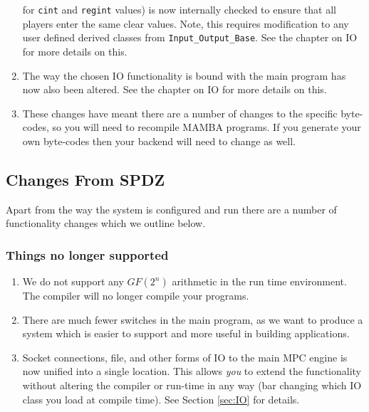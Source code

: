 \begin{enumerate}
for \verb+cint+ and \verb+regint+ values) is now internally checked to ensure that
all players enter the same clear values.
Note, this requires modification to any user defined
derived classes from \verb+Input_Output_Base+.
See the chapter on IO for more details on this.
\item The way the chosen IO functionality is bound with the main program
has now also been altered. See the chapter on IO for more details on this.
\item These changes have meant there are a number of changes to the
specific byte-codes, so you will need to recompile MAMBA programs.
If you generate your own byte-codes then your backend will need to
change as well.
\end{enumerate}


\subsection{Changes From SPDZ}
Apart from the way the system is configured and run there are
a number of functionality changes which we outline below.

\subsubsection{Things no longer supported}
\begin{enumerate}
\item We do not support any $GF(2^n)$ arithmetic in the run time
environment. The compiler will no longer compile your programs.
\item There are much fewer switches in the main program, as we want
to produce a system which is easier to support and more useful in
building applications.
\item Socket connections, file, and other forms of IO to the main MPC
engine is now unified into a single location. This allows {\em you} to
extend the functionality without altering the compiler or
run-time in any way (bar changing which IO class you load
at compile time). See Section \ref{sec:IO} for details.
\end{enumerate}

